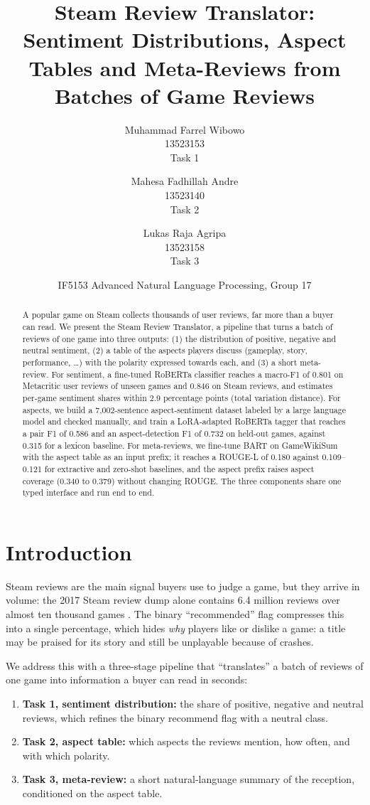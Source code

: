 \documentclass[11pt,a4paper]{article}
\title{Steam Review Translator: Sentiment Distributions, Aspect Tables and Meta-Reviews
from Batches of Game Reviews}
\author{Muhammad Farrel Wibowo\\13523153\\Task 1
  \and Mahesa Fadhillah Andre\\13523140\\Task 2
  \and Lukas Raja Agripa\\13523158\\Task 3}
\date{IF5153 Advanced Natural Language Processing, Group 17}
\begin{document}
\maketitle

\begin{abstract}
A popular game on Steam collects thousands of user reviews, far more than a buyer can read.
We present the Steam Review Translator, a pipeline that turns a batch of reviews of one game
into three outputs: (1) the distribution of positive, negative and neutral sentiment,
(2) a table of the aspects players discuss (gameplay, story, performance, \dots) with the
polarity expressed towards each, and (3) a short meta-review. For sentiment, a fine-tuned
RoBERTa classifier reaches a macro-F1 of 0.801 on Metacritic user reviews of unseen games and
0.846 on Steam reviews, and estimates per-game sentiment shares within 2.9 percentage points
(total variation distance). For aspects, we build a 7,002-sentence aspect-sentiment dataset
labeled by a large language model and checked manually, and train a LoRA-adapted RoBERTa tagger
that reaches a
pair F1 of 0.586 and an aspect-detection F1 of 0.732 on held-out games, against 0.315 for a
lexicon baseline. For meta-reviews, we fine-tune BART on GameWikiSum with the aspect table as
an input prefix; it reaches a ROUGE-L of 0.180 against 0.109--0.121 for extractive and zero-shot
baselines, and the aspect prefix raises aspect coverage (0.340 to 0.379) without changing ROUGE.
The three components
share one typed interface and run end to end.
\end{abstract}

\section{Introduction}

Steam reviews are the main signal buyers use to judge a game, but they arrive in volume:
the 2017 Steam review dump alone contains 6.4 million reviews over almost ten thousand games
\citep{sobkowicz2017steam}. The binary ``recommended'' flag compresses this into a single
percentage, which hides \emph{why} players like or dislike a game: a title may be praised for
its story and still be unplayable because of crashes.

We address this with a three-stage pipeline that ``translates'' a batch of reviews of one game
into information a buyer can read in seconds:
\begin{enumerate}
  \item \textbf{Task 1, sentiment distribution:} the share of positive, negative and neutral
    reviews, which refines the binary recommend flag with a neutral class.
  \item \textbf{Task 2, aspect table:} which aspects the reviews mention, how often, and with
    which polarity.
  \item \textbf{Task 3, meta-review:} a short natural-language summary of the reception,
    conditioned on the aspect table.
\end{enumerate}
\end{document}
